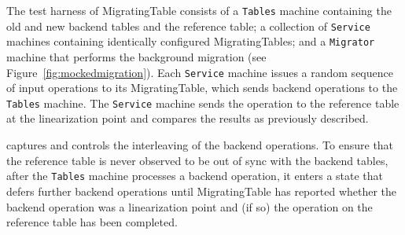 The \psharp test harness of MigratingTable consists of a \texttt{Tables} machine containing the old and new backend tables and the reference table; a collection of \texttt{Service} machines containing identically configured MigratingTables; and a \texttt{Migrator} machine that performs the background migration (see Figure~\ref{fig:mockedmigration}). Each \texttt{Service} machine issues a random sequence of input operations to its MigratingTable, which sends backend operations to the \texttt{Tables} machine. The \texttt{Service} machine sends the operation to the reference table at the linearization point and compares the results as previously described.

\psharp captures and controls the interleaving of the backend operations. To ensure that the reference table is never observed to be out of sync with the backend tables, after the \texttt{Tables} machine processes a backend operation, it enters a state that defers further backend operations until MigratingTable has reported whether the backend operation was a linearization point and (if so) the operation on the reference table has been completed.



